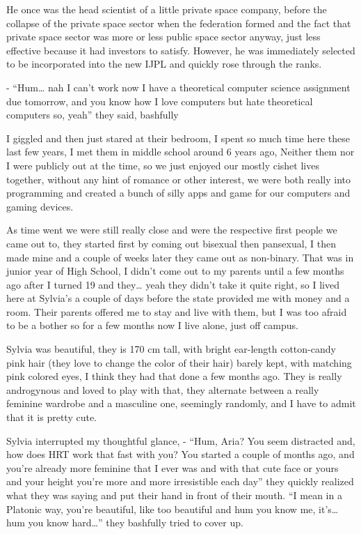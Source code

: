 \documentclass[hidelinks,12pt,a4paper]{book}
\begin{document}
He once was the head scientist of a little private space company, 
before the collapse of the private space sector when the federation formed 
and the fact that private space sector was more or less public space sector anyway, just less effective because 
it had investors to satisfy. However, he was immediately selected to be incorporated into the new IJPL and
quickly rose through the ranks.\par
\bigskip

- “Hum… nah I can't work now I have a theoretical computer science assignment due tomorrow,
and you know how I love computers but hate theoretical computers so, yeah” they said, bashfully\par
\bigskip

I giggled and then just stared at their bedroom, 
I spent so much time here these last few years, I met them in middle school around 6 years ago, 
Neither them nor I were publicly out at the time, so we just enjoyed our mostly cishet lives together,
 without any hint of romance or other interest, we were both really into programming and created a bunch of
silly apps and game for our computers and gaming devices.\par
\bigskip

As time went we were still really close and were the respective 
first people we came out to, they started first by coming out bisexual then pansexual, 
I then made mine and a couple of weeks later they came out as non-binary. That was in junior year of High School,
 I didn't come out to my parents until a few months ago after I turned 19 and they… yeah they didn't take it quite right, so
I lived here at Sylvia's a couple of days before the state provided me with money and a room. 
Their parents offered me to stay and live with them, but I was too afraid to be a bother so for a few months 
now I live alone, just off campus.\par 
\bigskip

Sylvia was beautiful, they is 170 cm tall, with bright ear-length cotton-candy pink hair 
(they love to change the color of their hair) barely kept, with matching pink colored eyes, 
I think they had that done a few months ago. They is really androgynous and loved to play with that, 
they alternate between a really feminine wardrobe and a masculine one, seemingly randomly, and 
I have to admit that it is pretty cute.\par
\bigskip

Sylvia interrupted my thoughtful glance,\newline
- “Hum, Aria? You seem distracted and, how does HRT work that fast with you? 
You started a couple of months ago, and you're already more feminine that I ever was and with that cute 
face or yours and your height you're more and more irresistible each day” they quickly realized what 
they was saying and put their hand in front of their mouth.\newline
“I mean in a Platonic way, you're beautiful, like too beautiful and hum you know me, it's… hum you know hard…” 
they bashfully tried to cover up.\par 
\bigskip
\end{document}
